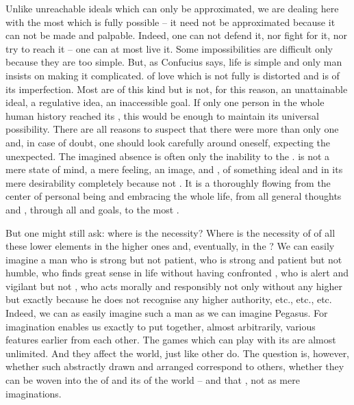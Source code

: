 Unlike unreachable ideals which can only be approximated, we are dealing here
with the most  which is fully possible -- it need not be
approximated because it can not be made  and palpable.  Indeed, one
can not defend it, nor fight for it, nor try to reach it -- one can at most live
it. Some impossibilities are difficult only because they are too simple. But, as
Confucius says, life is simple and only man insists on making it complicated.
 of love which is not fully  is distorted
and is  of its imperfection.  Most  are of this kind but
 is not, for this reason, an unattainable ideal, a regulative idea, an
inaccessible goal. If only one person in the whole human history reached its
, this would be enough to maintain its universal possibility.
There are all reasons to suspect that there were more than only one and, in case
of doubt, one should look carefully around oneself, {expecting the unexpected.}
The imagined absence is often only the inability to  the
.   is not a mere state of mind, a mere feeling,
an image,  and , of something ideal and in its mere
desirability completely  because not . It is a thoroughly
 flowing from the center of personal being and
embracing the whole life, from  all general thoughts and
, through all  and goals, to the most 
.


\pa
But one might still ask: where is the necessity? Where is the necessity of
 of all these lower elements in the higher ones and,
eventually, in the  ? We
can easily imagine a man who is strong but not patient, who is strong and
patient but not humble, who finds great sense in life without having confronted
, who is alert and vigilant but not , who acts morally and
responsibly not only without any higher  but exactly because he 
does not recognise any higher authority, etc., etc., etc.
Indeed, we can as easily imagine such a man as we can imagine Pegasus. For
imagination enables us exactly to put together, almost arbitrarily, various
features earlier  from each other. The games which
 can play with its  are almost
unlimited. And they affect the world, just like other  do. The
question is, however, whether such abstractly drawn  and
arranged  correspond
to others, whether they can be woven into the  of  and
its  of the world -- and that , not as mere
imaginations.

